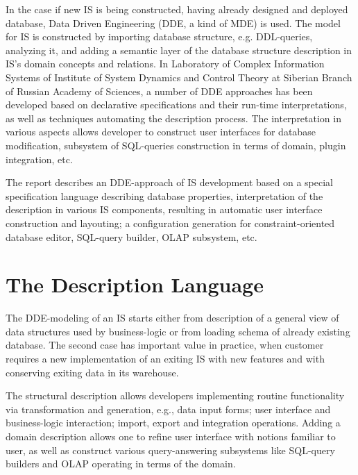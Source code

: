 \documentclass[conference]{IEEEtran}
\newcommand{\e}[2][fcolor]{\textcolor{pcolor}{[}\textcolor{#1}{#2}\textcolor{pcolor}{]}}
\begin{document}
In the case if new IS is being constructed, having already designed and deployed database, Data Driven Engineering (DDE, a kind of MDE) is used.  The model for IS is constructed by importing database structure, e.g. DDL-queries, analyzing it, and adding a semantic layer of the database structure description in IS's domain concepts and relations.  In Laboratory of Complex Information Systems of Institute of System Dynamics and Control Theory at Siberian Branch of Russian Academy of Sciences, a number of DDE approaches has been developed based on declarative specifications and their run-time interpretations, as well as techniques automating the description process.  The interpretation in various aspects allows developer to construct user interfaces for database modification, subsystem of SQL-queries construction in terms of domain, plugin integration, etc.

The report describes an DDE-approach of IS development based on a special specification language describing database properties, interpretation of the description in various IS components, resulting in automatic user interface construction and layouting; a configuration generation for constraint-oriented database editor, SQL-query builder, OLAP subsystem, etc.

\section{The Description Language}
\label{sec:description-database}


The DDE-modeling of an IS starts either from description of a general view of data structures used by business-logic or from loading schema of already existing database.  The second case has important value in practice, when customer requires a new implementation of an exiting IS with new features and with conserving exiting data in its warehouse.

The structural description allows developers implementing routine functionality via transformation and generation, e.g., data input forms; user interface and business-logic interaction; import, export and integration operations.  Adding a domain description allows one to refine user interface with notions familiar to user, as well as construct various query-answering subsystems like SQL-query builders and OLAP operating in terms of the domain.
\end{document}

